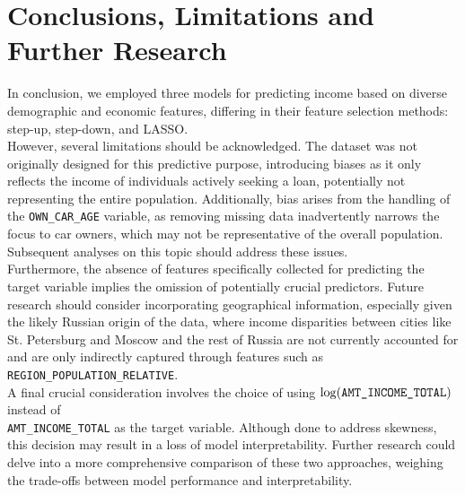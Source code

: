 \documentclass[hidelinks,12pt]{article}
\begin{document}
\section{Conclusions, Limitations and Further Research}
In conclusion, we employed three models for predicting income based on diverse demographic and economic features, differing in their feature selection methods: step-up, step-down, and LASSO.\\
However, several limitations should be acknowledged. The dataset was not originally designed for this predictive purpose, introducing biases as it only reflects the income of individuals actively seeking a loan, potentially not representing the entire population. Additionally, bias arises from the handling of the \verb|OWN_CAR_AGE| variable, as removing missing data inadvertently narrows the focus to car owners, which may not be representative of the overall population. Subsequent analyses on this topic should address these issues.\\
Furthermore, the absence of features specifically collected for predicting the target variable implies the omission of potentially crucial predictors. Future research should consider incorporating geographical information, especially given the likely Russian origin of the data, where income disparities between cities like St. Petersburg and Moscow and the rest of Russia are not currently accounted for and are only indirectly captured through features such as \verb|REGION_POPULATION_RELATIVE|.\\
A final crucial consideration involves the choice of using $\log(\verb|AMT_INCOME_TOTAL|)$ instead of\\ \verb|AMT_INCOME_TOTAL| as the target variable. Although done to address skewness, this decision may result in a loss of model interpretability. Further research could delve into a more comprehensive comparison of these two approaches, weighing the trade-offs between model performance and interpretability.
  
\end{document}

